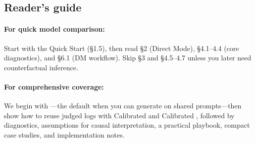 \subsection{Reader's guide}

\paragraph{For quick model comparison:} Start with the Quick Start (§1.5), then read §2 (Direct Mode), §4.1--4.4 (core diagnostics), and §6.1 (DM workflow). Skip §3 and §4.5--4.7 unless you later need counterfactual inference.

\paragraph{For comprehensive coverage:} We begin with \dm---the default when you can generate on shared prompts---then show how to reuse judged logs with Calibrated \ips{} and Calibrated \dr, followed by diagnostics, assumptions for causal interpretation, a practical playbook, compact case studies, and implementation notes.
